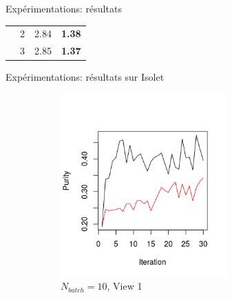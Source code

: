 \documentclass[hyperref={pdfpagelabels=false}]{beamer}
\begin{document}
\begin{frame}{Expérimentations: résultats}
\begin{table}[!h]
\begin{center}
{\begin{tabular}{cccc}
                                       & 2    & 2.84            & \textbf{1.38}                                                                  \\
                                       & 3    & 2.85            & \textbf{1.37}                                                                 \\ \midrule
                        \end{tabular}
                    }
                \end{center}
            \end{table}
        \end{frame}

        \begin{frame}{Expérimentations: résultats sur Isolet}
            \begin{figure}[!h]
                \centering
                \begin{subfigure}[b]{0.3\textwidth}
                    \centering
                    \includegraphics[width=0.7\textwidth, trim= 0cm 0.5cm 1cm 2cm, clip]{img/11.png}
                    \caption{$N_{batch}=10$, View 1}
                \end{subfigure}
                \begin{subfigure}[b]{0.3\textwidth}
                    \centering

\end{subfigure}
\end{figure}
\end{frame}
\end{document}
